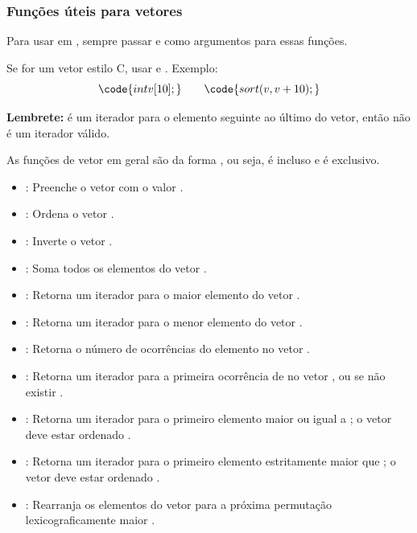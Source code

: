 \subsubsection{Funções úteis para vetores}

Para usar em , sempre passar  e  como argumentos para essas funções.

Se for um vetor estilo C, usar  e . Exemplo:
\[
\code{int v[10];}\qquad \code{sort(v, v + 10);}
\]

\textbf{Lembrete:}  é um iterador para o elemento seguinte ao último do vetor, então não é um iterador válido.

As funções de vetor em geral são da forma \code{[L, R)}, ou seja,  é incluso e  é exclusivo.
\begin{itemize}\setlength\itemsep{0pt}
    \item {}: Preenche o vetor  com o valor  .
    \item {}: Ordena o vetor  .
    \item {}: Inverte o vetor  .
    \item {}: Soma todos os elementos do vetor  .
    \item {}: Retorna um iterador para o maior elemento do vetor  .
    \item {}: Retorna um iterador para o menor elemento do vetor  .
    \item {}: Retorna o número de ocorrências do elemento  no vetor  .
    \item {}: Retorna um iterador para a primeira ocorrência de  no vetor , ou  se não existir .
    \item {}: Retorna um iterador para o primeiro elemento maior ou igual a ; o vetor deve estar ordenado .
    \item {}: Retorna um iterador para o primeiro elemento estritamente maior que ; o vetor deve estar ordenado .
    \item {}: Rearranja os elementos do vetor  para a próxima permutação lexicograficamente maior .
\end{itemize}

